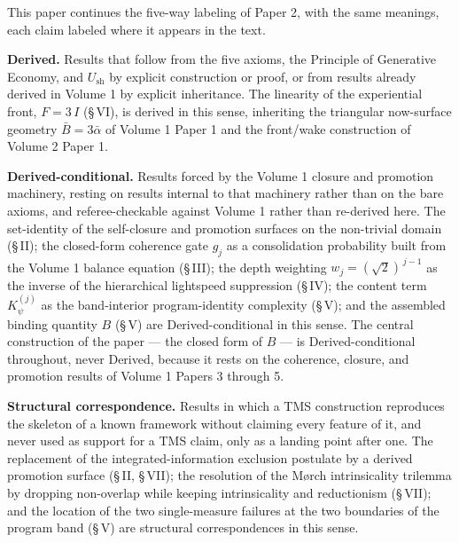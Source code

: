 \documentclass[11pt,oneside]{report}
\theoremstyle{definition}
\theoremstyle{remark}
\begin{document}
This paper continues the five-way labeling of Paper 2, with the same
meanings, each claim labeled where it appears in the text.

\textbf{Derived.} Results that follow from the five axioms, the Principle
of Generative Economy, and \ensuremath{U_{\mathrm{sh}}} by explicit
construction or proof, or from results already derived in Volume 1 by
explicit inheritance. The linearity of the experiential front,
\ensuremath{F = 3\,I} (\S\,VI), is derived in this sense, inheriting the
triangular now-surface geometry \ensuremath{\bar{B} = 3\bar{\alpha}} of
Volume 1 Paper 1 and the front/wake construction of Volume 2 Paper 1.

\textbf{Derived-conditional.} Results forced by the Volume 1 closure and
promotion machinery, resting on results internal to that machinery rather
than on the bare axioms, and referee-checkable against Volume 1 rather
than re-derived here. The set-identity of the self-closure and promotion
surfaces on the non-trivial domain (\S\,II); the closed-form coherence
gate \ensuremath{g_j} as a consolidation probability built from the Volume
1 balance equation (\S\,III); the depth weighting
\ensuremath{w_j = (\sqrt{2})^{\,j-1}} as the inverse of the hierarchical
lightspeed suppression (\S\,IV); the content term
\ensuremath{K_{\psi}^{(j)}} as the band-interior program-identity
complexity (\S\,V); and the assembled binding quantity \ensuremath{B}
(\S\,V) are Derived-conditional in this sense. The central construction of
the paper --- the closed form of \ensuremath{B} --- is Derived-conditional
throughout, never Derived, because it rests on the coherence, closure, and
promotion results of Volume 1 Papers 3 through 5.

\textbf{Structural correspondence.} Results in which a TMS construction
reproduces the skeleton of a known framework without claiming every
feature of it, and never used as support for a TMS claim, only as a
landing point after one. The replacement of the integrated-information
exclusion postulate by a derived promotion surface (\S\,II, \S\,VII); the
resolution of the M\o rch intrinsicality trilemma by dropping non-overlap
while keeping intrinsicality and reductionism (\S\,VII); and the location
of the two single-measure failures at the two boundaries of the program
band (\S\,V) are structural correspondences in this sense.
\end{document}
